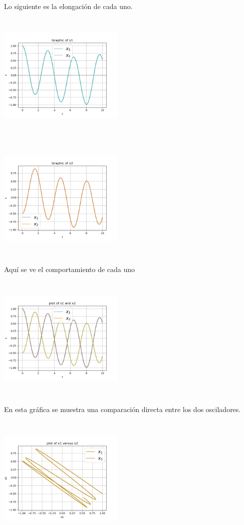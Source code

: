 \documentclass{article}
\begin{document}
Lo siguiente es la elongación de cada uno.

\begin{center}
  \includegraphics[width=6cm, height=6cm]{ej3_13.png}
\end{center}

\begin{center}
  \includegraphics[width=6cm, height=6cm]{ej3_14.png}
\end{center}

Aquí se ve el comportamiento de cada uno
\begin{center}
  \includegraphics[width=6cm, height=6cm]{ej3_15.png}
\end{center}

En esta gráfica se muestra una comparación directa entre los dos osciladores.
\begin{center}
  \includegraphics[width=6cm, height=6cm]{ej3_16.png}
\end{center}
\end{document}
